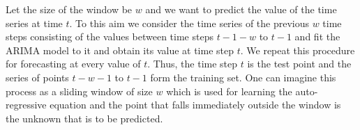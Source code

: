   Let the size of the window be $w$ and we want to predict the value of the time series at time $t$. To this aim we consider the time series of the previous $w$ 
  time steps consisting of the values between time steps $t-1-w$ to $t-1$ and fit the ARIMA model to it and obtain its value at time step $t$. 
 We repeat this procedure for forecasting at every value of $t$. Thus, the time step $t$ is the test point and the series of points $t-w-1$ to $t-1$ form the 
  training set. One can imagine this process as a sliding window of size $w$ which is used for learning the auto-regressive equation and the point that falls immediately 
  outside the window is the unknown that is to be predicted.
  
 
  
% 
